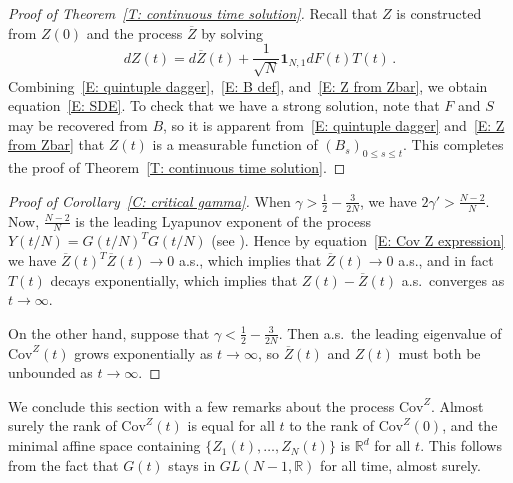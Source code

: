 \documentclass[12pt]{article}
\newcommand{\Cov}{\mathrm{Cov}}
\newcommand{\1}{\mathbf{1}}
\begin{document}
\begin{proof}[Proof of Theorem~\ref{T: continuous time solution}]
Recall that $Z$ is constructed from $Z(0)$ and the process $\overline{Z}$ by solving 
\begin{equation}\label{E: Z from Zbar} dZ(t) = d\overline{Z}(t) + \frac{1}{\sqrt{N}} \mathbf{1}_{N,1} dF(t) T(t)\,.\end{equation}
Combining~\eqref{E: quintuple dagger},~\eqref{E: B def}, and~\eqref{E: Z from Zbar}, we obtain equation~\eqref{E: SDE}. To check that we have a strong solution, note that $F$ and $S$ may be recovered from $B$, so it is apparent from~\eqref{E: quintuple dagger} and~\eqref{E: Z from Zbar} that $Z(t)$ is a measurable function of $(B_s)_{0 \le s \le t}$. This completes the proof of Theorem~\ref{T: continuous time solution}.
\end{proof}
\begin{proof}[Proof of Corollary~\ref{C: critical gamma}]
When $\gamma > \frac{1}{2} - \frac{3}{2N}$, we have $2\gamma' > \frac{N-2}{N}$. Now, $\frac{N-2}{N}$ is the leading Lyapunov exponent of the process $Y(t/N) = G(t/N)^T G(t/N)$ (see \cite{NRW}). Hence  by equation~\eqref{E: Cov Z expression} we have $\overline{Z}(t)^T \overline{Z}(t) \to 0$ a.s., which implies that $\overline{Z}(t) \to 0$ a.s., and in fact  $T(t)$ decays exponentially, which implies that $Z(t) -\overline{Z}(t)$ a.s.~converges as $t \to \infty$.


On the other hand, suppose that $\gamma < \frac{1}{2} - \frac{3}{2N}$. Then a.s.~the leading eigenvalue of $\mathrm{Cov}^Z(t)$ grows exponentially as $t \to \infty$, so $\overline{Z}(t)$ and $Z(t)$ must both be unbounded as $t \to \infty$.  
\end{proof}
We conclude this section with a few remarks about the process $\mathrm{Cov}^Z$. Almost surely the rank of $\Cov^Z(t)$ is equal for all $t$ to the rank of $\Cov^Z(0)$, and the minimal affine space containing $\{Z_1(t), \dots, Z_N(t)\}$ is $\mathbb{R}^d$ for all $t$. This follows from the fact that $G(t)$ stays in $GL(N-1,\mathbb{R})$ for all time, almost surely. 
\end{document}
